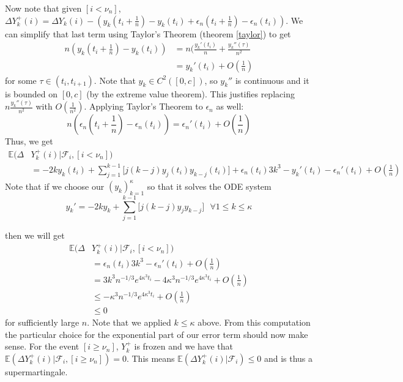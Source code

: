 Now note that given \([i < \nu_{n}]\), \(\Delta Y_{k}^{+}(i) = \Delta Y_{k}(i) - (y_{k}(t_{i} + \frac{1}{n}) - y_{k}(t_{i}) + \epsilon_{n}(t_{i} + \frac{1}{n}) - \epsilon_{n}(t_{i}))\). We can simplify that last term using Taylor's Theorem (theorem \ref{taylor}) to get
\begin{align*}
    n(y_{k}(t_{i} + \frac{1}{n}) - y_{k}(t_{i})) &= n(\frac{y_{k}'(t_{i})}{n} + \frac{y_{k}''(\tau)}{n^{2}} \\
    &= y_{k}'(t_{i}) + O(\frac{1}{n})
\end{align*}
for some \(\tau \in (t_{i}, t_{i+1})\). Note that \(y_{k} \in C^{2}([0, c])\), so \(y_{k}''\) is continuous and it is bounded on \([0, c]\) (by the extreme value theorem). This justifies replacing \(n\frac{y_{k}''(\tau)}{n^{2}}\) with \(O(\frac{1}{n^{2}})\). Applying Taylor's Theorem to \(\epsilon_{n}\) as well:
\[n(\epsilon_{n}(t_{i} + \frac{1}{n}) - \epsilon_{n}(t_{i})) = \epsilon_{n}'(t_{i}) + O(\frac{1}{n})\]
Thus, we get
\begin{align*}
    \mathbb{E}(\Delta &Y^{+}_{k}(i)|\mathcal{F}_{i}, [i < \nu_{n}]) \\
    &= -2 k y_{k}(t_{i}) + \sum\limits_{j=1}^{k-1} \Big[ j (k - j) y_{j}(t_{i})y_{k-j}(t_{i})\Big]  + \epsilon_{n}(t_{i}) 3 k^{3} - y_{k}'(t_{i}) - \epsilon_{n}'(t_{i}) + O(\frac{1}{n})
\end{align*}
Note that if we choose our \((y_{k})_{k=1}^{\kappa}\) so that it solves the ODE system
\[y_{k}' = -2 k y_{k} + \sum\limits_{j=1}^{k-1} \Big[ j (k - j) y_{j}y_{k-j}\Big] \text{ } \forall 1 \leq k \leq \kappa \]

then we will get 
\begin{align*}
    \mathbb{E}(\Delta &Y^{+}_{k}(i)|\mathcal{F}_{i}, [i < \nu_{n}]) \\
    &= \epsilon_{n}(t_{i}) 3 k^{3} - \epsilon_{n}'(t_{i}) + O(\frac{1}{n})\\
    &=  3 k^{3} n^{-1/3} e^{4 \kappa^{3}t_{i}} - 4 \kappa^{3} n^{-1/3} e^{4 \kappa^{3}t_{i}} + O(\frac{1}{n}) \\
    &\leq  -\kappa^{3} n^{-1/3} e^{4 \kappa^{3}t_{i}} + O(\frac{1}{n}) \\
    &\leq 0
\end{align*}
for sufficiently large \(n\). Note that we applied \(k \leq \kappa\) above. From this computation the particular choice for the exponential part of our error term should now make sense. For the event \([i \geq \nu_{n}]\), \(Y^{+}_{k}\) is frozen and we have that \(\mathbb{E}(\Delta Y^{+}_{k}(i)|\mathcal{F}_{i}, [i \geq \nu_{n}]) = 0\). This means \(\mathbb{E}(\Delta Y^{+}_{k}(i)|\mathcal{F}_{i})\leq 0\) and is thus a supermartingale.

